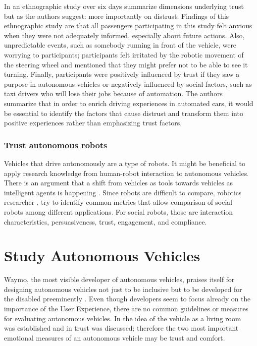 In an ethnographic study over six days \citet{Lee2016} summarize dimensions underlying trust but as the authors suggest: more importantly on distrust.  Findings of this ethnographic study are that all passengers participating in this study felt anxious when they were not adequately informed, especially about future actions. Also, unpredictable events, such as somebody running in front of the vehicle, were worrying to participants; participants felt irritated by the robotic movement of the steering wheel and mentioned that they might prefer not to be able to see it turning. Finally, participants were positively influenced by trust if they saw a purpose in autonomous vehicles or negatively influenced by social factors, such as taxi drivers who will lose their jobs because of automation. The authors summarize that in order to enrich driving experiences in automated cars, it would be essential to identify the factors that cause distrust and transform them into positive experiences rather than emphasizing trust factors. 

\subsubsection{Trust autonomous robots}
Vehicles that drive autonomously are a type of robots. It might be beneficial to apply research knowledge from human-robot interaction to autonomous vehicles. There is an argument that a shift from vehicles as tools towards vehicles as intelligent agents is happening \citep{Thill}. Since robots are difficult to compare, robotics researcher \cite{Steinfeld2006}, try to identify common metrics that allow comparison of social robots among different applications. For social robots, those are interaction characteristics, persuasiveness, trust, engagement, and compliance. 

\section{Study Autonomous Vehicles}\label{sec:studies}
Waymo, the most visible developer of autonomous vehicles, praises itself for designing autonomous vehicles not just to be inclusive but to be developed for the disabled preeminently \citep{Waymo2018DriverlessApplication}. Even though developers seem to focus already on the importance of the User Experience, there are no common guidelines or measures for evaluating autonomous vehicles. In \emph{} the idea of the vehicle as a living room was established and in \emph{} trust was discussed; therefore the two most important emotional measures of an autonomous vehicle may be trust and comfort.  

